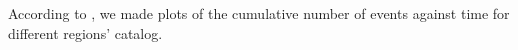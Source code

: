 According to \citet{Frankel1995}, we made plots of the cumulative number of events against time for different regions' catalog. 


